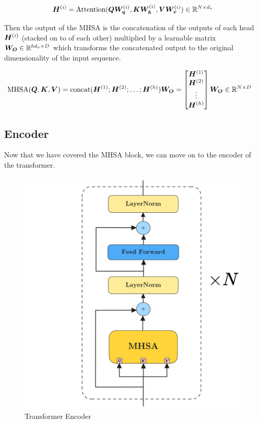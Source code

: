 \documentclass[../../main.tex]{subfiles}
\begin{document}
\begin{equation}
	\bm{H}^{(i)} = \text{Attention}(\bm{Q}\bm{W_q}^{(i)}, \bm{K}\bm{W_k}^{(i)}, \bm{V}\bm{W_v}^{(i)}) \in \mathbb{R}^{N \times d_v}
\end{equation}

Then the output of the MHSA is the concatenation of the outputs of each head $\bm{H}^{(i)}$ (stacked on to of each other) multiplied by a learnable matrix $\bm{W_O} \in \mathbb{R}^{hd_v \times D}$ which transforms the concatenated output to the original dimensionality of the input sequence.

\begin{align*}
	 \text{MHSA}(\bm{Q}, \bm{K}, \bm{V}) &= \text{concat}(\bm{H}^{(1)}; \bm{H}^{(2)}; \dots; \bm{H}^{(h)})\bm{W_O} 
	= \begin{bmatrix}
		\bm{H}^{(1)} \\
		\bm{H}^{(2)} \\
		\vdots \\
		\bm{H}^{(h)}
	\end{bmatrix} \bm{W_O} \in \mathbb{R}^{N \times D}
\end{align*}



\subsection{Encoder}

Now that we have covered the MHSA block, we can move on to the encoder of the transformer.

\begin{figure}[H]
	\centering
	\includegraphics[height=0.5\textwidth]{./encoder.png}
	\caption{Transformer Encoder \parencite{vaswani2017attention}}
	\label{fig:encoder}
\end{figure}
\end{document}
